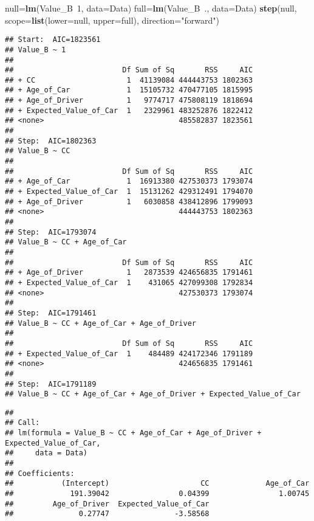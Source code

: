 \documentclass[]{article}
\newenvironment{Shaded}{\begin{snugshade}}{\end{snugshade}}
\newcommand{\KeywordTok}[1]{\textcolor[rgb]{0.13,0.29,0.53}{\textbf{{#1}}}}
\newcommand{\DataTypeTok}[1]{\textcolor[rgb]{0.13,0.29,0.53}{{#1}}}
\newcommand{\DecValTok}[1]{\textcolor[rgb]{0.00,0.00,0.81}{{#1}}}
\newcommand{\StringTok}[1]{\textcolor[rgb]{0.31,0.60,0.02}{{#1}}}
\newcommand{\NormalTok}[1]{{#1}}
\begin{document}
\begin{Shaded}
\begin{Highlighting}[]
\NormalTok{null=}\KeywordTok{lm}\NormalTok{(Value_B~}\DecValTok{1}\NormalTok{, }\DataTypeTok{data=}\NormalTok{Data)}
\NormalTok{full=}\KeywordTok{lm}\NormalTok{(Value_B~., }\DataTypeTok{data=}\NormalTok{Data)}
\KeywordTok{step}\NormalTok{(null, }\DataTypeTok{scope=}\KeywordTok{list}\NormalTok{(}\DataTypeTok{lower=}\NormalTok{null, }\DataTypeTok{upper=}\NormalTok{full), }\DataTypeTok{direction=}\StringTok{"forward"}\NormalTok{)}
\end{Highlighting}
\end{Shaded}

\begin{verbatim}
## Start:  AIC=1823561
## Value_B ~ 1
## 
##                         Df Sum of Sq       RSS     AIC
## + CC                     1  41139084 444443753 1802363
## + Age_of_Car             1  15105732 470477105 1815995
## + Age_of_Driver          1   9774717 475808119 1818694
## + Expected_Value_of_Car  1   2329961 483252876 1822412
## <none>                               485582837 1823561
## 
## Step:  AIC=1802363
## Value_B ~ CC
## 
##                         Df Sum of Sq       RSS     AIC
## + Age_of_Car             1  16913380 427530373 1793074
## + Expected_Value_of_Car  1  15131262 429312491 1794070
## + Age_of_Driver          1   6030858 438412896 1799093
## <none>                               444443753 1802363
## 
## Step:  AIC=1793074
## Value_B ~ CC + Age_of_Car
## 
##                         Df Sum of Sq       RSS     AIC
## + Age_of_Driver          1   2873539 424656835 1791461
## + Expected_Value_of_Car  1    431065 427099308 1792834
## <none>                               427530373 1793074
## 
## Step:  AIC=1791461
## Value_B ~ CC + Age_of_Car + Age_of_Driver
## 
##                         Df Sum of Sq       RSS     AIC
## + Expected_Value_of_Car  1    484489 424172346 1791189
## <none>                               424656835 1791461
## 
## Step:  AIC=1791189
## Value_B ~ CC + Age_of_Car + Age_of_Driver + Expected_Value_of_Car
\end{verbatim}

\begin{verbatim}
## 
## Call:
## lm(formula = Value_B ~ CC + Age_of_Car + Age_of_Driver + Expected_Value_of_Car, 
##     data = Data)
## 
## Coefficients:
##           (Intercept)                     CC             Age_of_Car  
##             191.39042                0.04399                1.00745  
##         Age_of_Driver  Expected_Value_of_Car  
##               0.27747               -3.58568
\end{verbatim}
\end{document}
